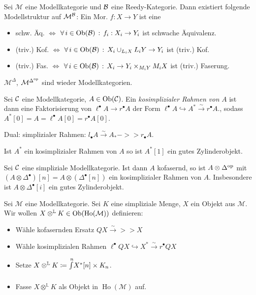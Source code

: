 \documentclass{cheat-sheet}
\newcommand{\ModC}{\mathcal{M}} %
\DeclareMathOperator{\Ho}{Ho} %
\newcommand{\LL}{\mathbb{L}} %
\begin{document}
\begin{satz}
  Sei $\ModC$ eine Modellkategorie und $\mathcal{B}$ eine Reedy-Kategorie.
  Dann existiert folgende Modellstruktur auf $\ModC^\Bat$: Ein Mor. $f : X \to Y$ ist eine
  \begin{itemize}
    \item schw. Äq. $\iff$ $\forall \, {i \in \operatorname{Ob}(\mathcal{B})} \,:\, f_i : X_i \to Y_i$ ist schwache Äquivalenz.
    \item (triv.) Kof. $\iff$ $\forall \, {i \in \operatorname{Ob}(\mathcal{B})} \,:\, X_i \cup_{L_i X} L_i Y \to Y_i$ ist (triv.) Kof.
    \item (triv.) Fas. $\iff$ $\forall \, {i \in \operatorname{Ob}(\mathcal{B})} \,:\, X_i \to Y_i \times_{M_i Y} M_i X$ ist (triv.) Faserung.
  \end{itemize}
\end{satz}

\begin{bsp}
  $\ModC^\Delta$, $\ModC^{\Delta^\op}$ sind wieder Modellkategorien.
\end{bsp}

\begin{defn}
  Sei $\mathcal{C}$ eine Modellkategorie, $A \in \operatorname{Ob}(\mathcal{C})$.
  Ein \emph{kosimplizialer Rahmen von $A$} ist dann eine Faktorisierung von $\ell^\bullet A \to r^\bullet A$ der Form $\ell^\bullet A \hookrightarrow A^* \xrightarrow{{\sim}} r^\bullet A$., sodass $A^* [0] = A = \ell^\bullet A [0] = r^\bullet A [0]$.
\end{defn}

\begin{bem}
  Dual: simplizialer Rahmen: $l_\bullet A \xrightarrow{{\sim}} A_* ->> r_\bullet A$.
\end{bem}

\begin{bem}
  Ist $A^*$ ein kosimplizialer Rahmen von $A$ so ist $A^*[1]$ ein gutes Zylinderobjekt.
\end{bem}

\begin{bsp}
  Sei $\mathcal{C}$ eine simpliziale Modellkategorie.
  Ist dann $A$ kofasernd, so ist $A \otimes \Delta^{\mathrm{op}}$ mit $(A \otimes \Delta^\bullet)[n] = A \otimes (\Delta^\bullet [n])$ ein kosimplizialer Rahmen von $A$.
  Insbesondere ist $A \otimes \Delta^\bullet [i]$ ein gutes Zylinderobjekt.
\end{bsp}


Sei $\ModC$ eine Modellkategorie.
Sei $K$ eine simpliziale Menge, $X$ ein Objekt aus $\ModC$.
Wir wollen $X \otimes^{\LL} K \in \Ob(\Ho(\ModC))$ definieren:
\begin{itemize}
  \item Wähle kofasernden Ersatz $QX \xrightarrow{{\sim}} >> X$
  \item Wähle kosimplizialen Rahmen $\ell^\bullet Q X \hookrightarrow X^* \xrightarrow{{\sim}} r^\bullet Q X$
  \item Setze $X \otimes^{\LL} K \coloneqq \CoEndC{n}{X^*[n] \times K_n}$.
  \item Fasse $X \otimes^{\LL} K$ als Objekt in $\Ho(\ModC)$ auf.
\end{itemize}
\end{document}
